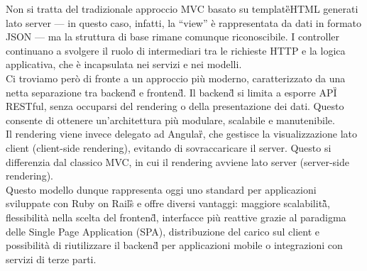 \documentclass[a4paper,11pt]{article}
\begin{document}
Non si tratta del tradizionale approccio MVC basato su template\G{}HTML generati lato server — in questo caso, infatti, la 
“view” è rappresentata da dati in formato JSON — ma la struttura di base rimane comunque riconoscibile. I controller continuano a 
svolgere il ruolo di intermediari tra le richieste HTTP e la logica applicativa, che è incapsulata nei servizi e nei modelli.\\
Ci troviamo però di fronte a un approccio più moderno, caratterizzato da una netta separazione tra backend\G{} e frontend\G{}. Il backend\G{} si limita a 
esporre API\G{} RESTful, senza occuparsi del rendering o della presentazione dei dati. Questo consente di ottenere un'architettura più modulare, 
scalabile e manutenibile.\\
Il rendering viene invece delegato ad Angular\G{}, che gestisce la visualizzazione lato client (client-side rendering), evitando di sovraccaricare 
il server. Questo si differenzia dal classico MVC, in cui il rendering avviene lato server (server-side rendering).\\

Questo modello dunque rappresenta oggi uno standard per applicazioni sviluppate con Ruby on Rails\G{} e offre diversi vantaggi: maggiore scalabilità\G{}, 
flessibilità nella scelta del frontend\G{}, interfacce più reattive grazie al paradigma delle Single Page Application (SPA), distribuzione del 
carico sul client e possibilità di riutilizzare il backend\G{} per applicazioni mobile o integrazioni con servizi di terze parti.
\end{document}
